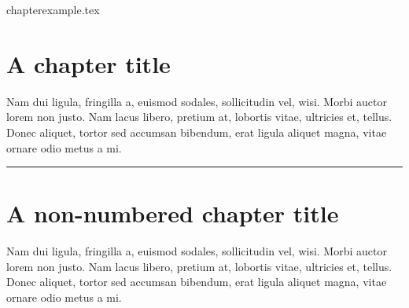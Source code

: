 \begin{filecontents}{chapterexample.tex}
\let\clearforchapter\par %
\chapter{A chapter title}
Nam dui ligula, fringilla a, euismod sodales, sollicitudin vel,
wisi. Morbi auctor lorem non justo. Nam lacus libero, pretium at,
lobortis vitae, ultricies et, tellus. Donec aliquet, tortor sed
accumsan bibendum, erat ligula aliquet magna, vitae ornare odio metus
a mi.
\par\fancybreak{$***$}\par
\chapter*{A non-numbered chapter title}
Nam dui ligula, fringilla a, euismod sodales, sollicitudin vel,
wisi. Morbi auctor lorem non justo. Nam lacus libero, pretium at,
lobortis vitae, ultricies et, tellus. Donec aliquet, tortor sed
accumsan bibendum, erat ligula aliquet magna, vitae ornare odio metus
a mi.  \thispagestyle{empty}
\end{filecontents}
